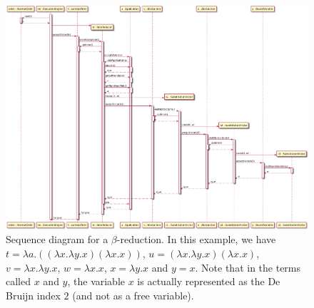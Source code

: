 \begin{figure}[H]
	\centering
	\includegraphics[width=\textwidth]{sequenceDiagrams/betaReduction}
	\caption{Sequence diagram for a $\beta$-reduction. In this example, we have $t = \lambda a.((\lambda x.\lambda y.x)(\lambda x.x))$,
		$u = (\lambda x.\lambda y.x)(\lambda x.x)$, $v = \lambda x.\lambda y.x$,
		$w = \lambda x.x$, $x = \lambda y.x$ and $y = x$. Note that in the terms called
		$x$ and $y$, the variable $x$ is actually represented as the De Bruijn index $2$
		(and not as a free variable).}
\end{figure}

